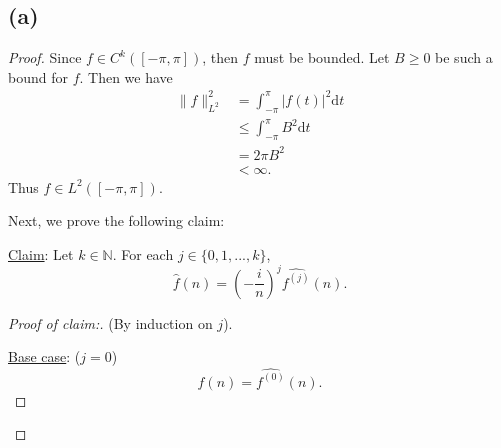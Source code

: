 \documentclass{article}
\newcommand{\N}{\mathbb{N}} %
\begin{document}
\subsection*{(a)}
\begin{proof}
	Since $f \in C^k([-\pi, \pi])$, then $f$ must be bounded. Let $B \geq 0$ be such a bound for $f$. Then we have
	\begin{align}
		\|f\|_{L^2}^2 &= \int_{-\pi}^\pi |f(t)|^2 \mathrm{d}t \\
		& \leq \int_{-\pi}^\pi B^2 \mathrm{d}t \\
		&= 2\pi B^2 \\
		& < \infty.
	\end{align}
	Thus $f \in L^2([-\pi, \pi])$.
	
	Next, we prove the following claim:
	
	\underline{Claim}: Let $k \in \N$. For each $j \in \{0, 1, ..., k\}$, 
	\begin{equation}
		\hat{f}(n) = \left(-\frac{i}{n}\right)^j \widehat{f^{(j)}}(n).
	\end{equation}
	\begin{proof}[Proof of claim:]
		(By induction on $j$).
		
		\underline{Base case}: ($j=0$) $$\hat{f}(n) = \widehat{f^{(0)}}(n).$$
		

\end{proof}
\end{proof}
\end{document}
